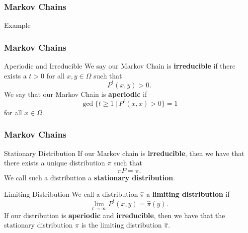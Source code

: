 \documentclass[svgnames,english]{beamer} %
\begin{document}
\begin{frame}
\frametitle{Markov Chains}
\begin{block}{Example}
\end{block}
\end{frame}

\begin{frame}
\frametitle{Markov Chains}
\begin{block}{Aperiodic and Irreducible}
We say our Markov Chain is \textbf{irreducible} if there exists a $t > 0$ for all $x,y \in \Omega$ such that 
\[ P^t(x,y) > 0. \]
We say that our Markov Chain is \textbf{aperiodic} if
\[ \gcd\{t \geq 1 \ | \ P^t(x,x) > 0\} = 1 \]
for all $x \in \Omega$.
\end{block}
\end{frame}

\begin{frame}
\frametitle{Markov Chains}
\begin{block}{Stationary Distribution}
If our Markov chain is \textbf{irreducible}, then we have that there exists a unique distribution $\pi$ such that 
\[ \pi P = \pi.\]
We call such a distribution a \textbf{stationary distribution}.
\end{block} 
\begin{block}{Limiting Distribution}
We call a distribution $\hat{\pi}$ a \textbf{limiting distribution} if 
\[\lim_{t \rightarrow \infty} P^t(x,y) = \hat{\pi}(y). \]
If our distribution is \textbf{aperiodic} and \textbf{irreducible}, then we have that the stationary distribution $\pi$ is the limiting distribution $\hat{\pi}$.
\end{block}
\end{frame}
\end{document}
